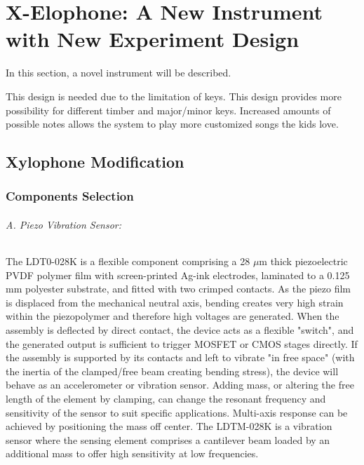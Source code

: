 ﻿\chapter{X-Elophone: A New Instrument with New Experiment Design}
In this section, a novel instrument will be described.

This design is needed due to the limitation of keys. This design provides more 
possibility for different timber and major/minor keys. Increased amounts of possible notes
allows the system to play more customized songs the kids love.

\section{Xylophone Modification}

\subsection{Components Selection}

\subparagraph{A. Piezo Vibration Sensor: }
The LDT0-028K is a flexible component comprising a 28 $\mu$m thick piezoelectric PVDF
polymer film with screen-printed Ag-ink electrodes, laminated to a 0.125 mm polyester 
substrate, and fitted with two crimped contacts. As the piezo film is displaced from 
the mechanical neutral axis, bending creates very high strain within the piezopolymer 
and therefore high voltages are generated. When the assembly is deflected by direct 
contact, the device acts as a flexible "switch", and the generated output is sufficient 
to trigger MOSFET or CMOS stages directly. If the assembly is supported by its contacts 
and left to vibrate "in free space" (with the inertia of the clamped/free beam creating 
bending stress), the device will behave as an accelerometer or vibration sensor. Adding 
mass, or altering the free length of the element by clamping, can change the resonant 
frequency and sensitivity of the sensor to suit specific applications. Multi-axis response 
can be achieved by positioning the mass off center. The LDTM-028K is a vibration sensor 
where the sensing element comprises a cantilever beam loaded by an additional mass to 
offer high sensitivity at low frequencies. 


